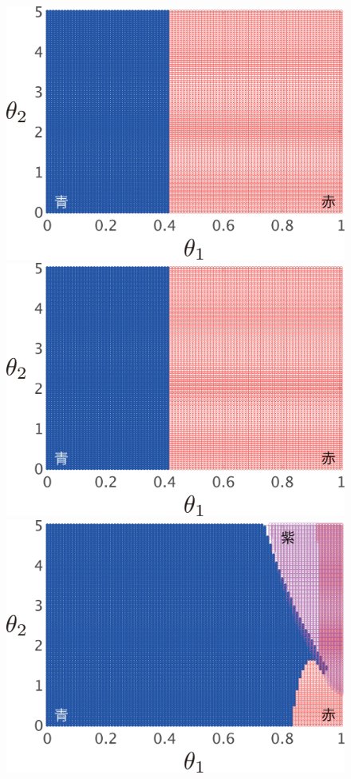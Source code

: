 \documentclass[graybox, envcountchap]{svmult}
\begin{document}
\begin{figure}[t!]
  \centering
  {
  \begin{minipage}{0.49\linewidth}
    \centering
    \includegraphics[width = 0.90\linewidth]{figs/Y1D1X}
    \medskip
  \end{minipage}
  \begin{minipage}{0.49\linewidth}
    \centering
    \includegraphics[width = 0.90\linewidth]{figs/Y1D0.01X}
    \medskip
  \end{minipage}
}
  \centering
  {
  \begin{minipage}{0.49\linewidth}
      \centering
    \includegraphics[width = 0.90\linewidth]{figs/Y0.01D1X}

\end{minipage}}
\end{figure}
\end{document}
